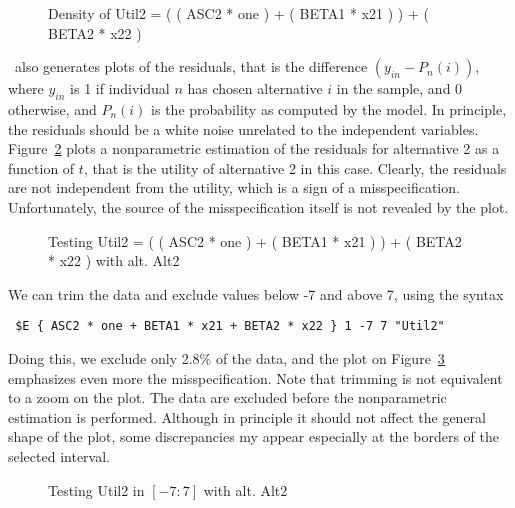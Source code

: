 \documentclass[12pt]{memoir}
\begin{document}
\begin{figure}
\begin{center}
\caption{\label{fig:1_proba}Density of Util2 = ( (  ASC2   *  one   ) + (  BETA1   *  x21   ) ) + (  BETA2   *  x22   )}
\end{center}
 \end{figure}


\BIOSIM\ also generates plots of the residuals, that is the difference
$(y_{in}-P_n(i))$, where $y_{in}$ is 1 if individual $n$ has chosen alternative
$i$ in the sample, and 0 otherwise, and $P_n(i)$ is the probability as
computed by the model. In principle, the residuals should be a white
noise unrelated to the independent variables. Figure~\ref{fig:1_1}
plots a nonparametric estimation of the residuals for alternative 2 as a function of $t$, that is
the utility of alternative 2 in this case.  Clearly, the residuals are
not independent from the utility, which is a sign of a
misspecification.  Unfortunately, the source of the misspecification
itself is not revealed by the plot.

\begin{figure}
\begin{center}
\caption{\label{fig:1_1}Testing Util2 = ( (  ASC2   *  one   ) + (  BETA1   *  x21   ) ) + (  BETA2   *  x22   ) with alt. Alt2}
\end{center}
 \end{figure}

We can trim the data and exclude values below -7 and above 7, using the syntax 
{\footnotesize
\begin{verbatim}
 $E { ASC2 * one + BETA1 * x21 + BETA2 * x22 } 1 -7 7 "Util2" 
\end{verbatim}
}
Doing this, we exclude only 2.8\% of the data, and the plot on
Figure~\ref{fig:1_1trim} emphasizes even more the misspecification.
Note that trimming is not equivalent to a zoom on the plot. The data
are excluded before the nonparametric estimation is
performed. Although in principle it should not affect the general
shape of the plot, some discrepancies my appear especially at the
borders of the selected interval.

\begin{figure}
\begin{center}
\caption{\label{fig:1_1trim}Testing Util2 in $[-7:7]$ with alt. Alt2}
\end{center}
 \end{figure}
\end{document}
